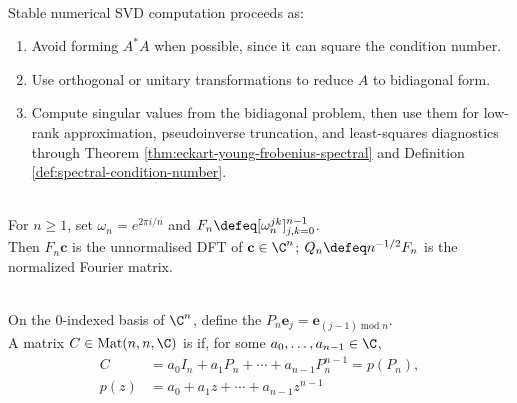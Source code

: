 \begin{method} \label{meth:svd-numerics-preview} \\
Stable numerical SVD computation proceeds as:
\begin{enumerate}[label=(\roman*)]
\setlength{\itemsep}{0pt}
\item Avoid forming $A^*A$ when possible, since it can square the condition number.
\item Use orthogonal or unitary transformations to reduce $A$ to bidiagonal form.
\item Compute singular values from the bidiagonal problem, then use them for low-rank approximation, pseudoinverse truncation, and least-squares diagnostics through Theorem \ref{thm:eckart-young-frobenius-spectral} and Definition \ref{def:spectral-condition-number}.
\end{enumerate}
\end{method}

\begin{definition} \label{def:discrete-fourier-matrix} \\
For $n\geq1$, set $\omega_n=e^{2\pi i/n}$ and $F_n\defeq[\omega_n^{jk}]_{j,k=0}^{n-1}$.\\
Then $F_n\mathbf{c}$ is the unnormalised DFT of $\mathbf{c}\in\C^n$; $Q_n\defeq n^{-1/2}F_n$ is the normalized Fourier matrix.
\end{definition}

\begin{definition} \label{def:circulant-matrix-cyclic-shift} \\
On the $0$-indexed basis of $\C^n$, define the 
$P_n\mathbf{e}_j=\mathbf{e}_{(j-1)\operatorname{mod} n}$.\\
A matrix $C\in\operatorname{Mat}(n,n,\C)$ is  if, for some $a_0,\ldots,a_{n-1}\in\C$,
\begin{align}
C&=a_0I_n+a_1P_n+\cdots+a_{n-1}P_n^{n-1}=p(P_n), \nonumber\\
p(z)&=a_0+a_1z+\cdots+a_{n-1}z^{n-1} \nonumber
\end{align}
\end{definition}

